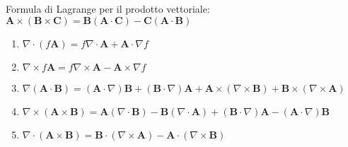 Formula di Lagrange per il prodotto vettoriale: $\mathbf{A} \times(\mathbf{B} \times \mathbf{C})=\mathbf{B}(\mathbf{A} \cdot \mathbf{C})-\mathbf{C}(\mathbf{A} \cdot \mathbf{B})$
\begin{enumerate}
	\item $\nabla \cdot(f \mathbf{A})=f \nabla \cdot \mathbf{A}+\mathbf{A} \cdot \nabla f$
	\item $\nabla \times f \mathbf{A}=f \nabla \times \mathbf{A}-\mathbf{A} \times \nabla f$
	\item $\nabla(\mathbf{A} \cdot \mathbf{B})=(\mathbf{A} \cdot \nabla) \mathbf{B}+(\mathbf{B} \cdot \nabla) \mathbf{A}+\mathbf{A} \times(\nabla \times \mathbf{B})+\mathbf{B} \times(\nabla \times \mathbf{A})$
	\item $\nabla \times(\mathbf{A} \times \mathbf{B})=\mathbf{A}(\nabla \cdot \mathbf{B})-\mathbf{B}(\nabla \cdot \mathbf{A})+(\mathbf{B} \cdot \nabla) \mathbf{A}-(\mathbf{A} \cdot \nabla) \mathbf{B}$
	\item $\nabla \cdot(\mathbf{A} \times \mathbf{B})=\mathbf{B} \cdot(\nabla \times \mathbf{A})-\mathbf{A} \cdot(\nabla \times \mathbf{B})$
\end{enumerate}